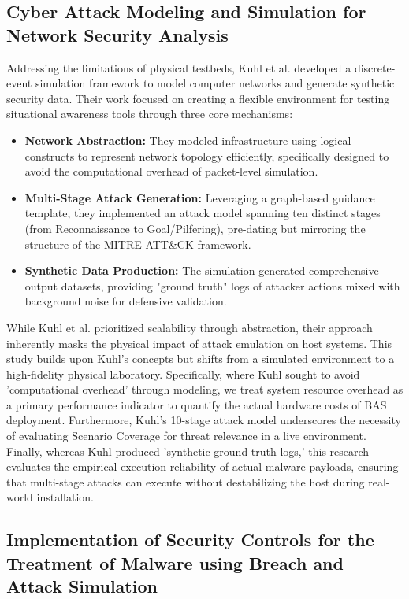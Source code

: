 \subsection{Cyber Attack Modeling and Simulation for Network Security Analysis}
Addressing the limitations of physical testbeds, Kuhl et al. \cite{kuhl2007} developed a discrete-event simulation framework to model computer networks and generate synthetic security data. Their work focused on creating a flexible environment for testing situational awareness tools through three core mechanisms:
\begin{itemize}
    \item \textbf{Network Abstraction:} They modeled infrastructure using logical constructs to represent network topology efficiently, specifically designed to avoid the computational overhead of packet-level simulation.
    \item \textbf{Multi-Stage Attack Generation:} Leveraging a graph-based guidance template, they implemented an attack model spanning ten distinct stages (from Reconnaissance to Goal/Pilfering), pre-dating but mirroring the structure of the MITRE ATT\&CK framework.
    \item \textbf{Synthetic Data Production:} The simulation generated comprehensive output datasets, providing "ground truth" logs of attacker actions mixed with background noise for defensive validation.
\end{itemize}

While Kuhl et al. prioritized scalability through abstraction, their approach inherently masks the physical impact of attack emulation on host systems. This study builds upon Kuhl’s concepts but shifts from a simulated environment to a high-fidelity physical laboratory. Specifically, where Kuhl sought to avoid 'computational overhead' through modeling, we treat system resource overhead as a primary performance indicator to quantify the actual hardware costs of BAS deployment. Furthermore, Kuhl’s 10-stage attack model underscores the necessity of evaluating Scenario Coverage for threat relevance in a live environment. Finally, whereas Kuhl produced 'synthetic ground truth logs,' this research evaluates the empirical execution reliability of actual malware payloads, ensuring that multi-stage attacks can execute without destabilizing the host during real-world installation.

\subsection{Implementation of Security Controls for the Treatment of Malware using Breach and Attack Simulation}

